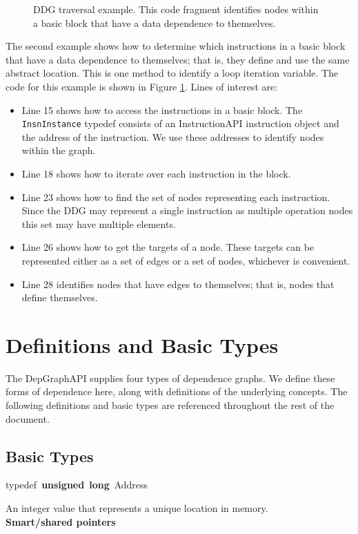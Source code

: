 \documentclass[12pt,titlepage]{article}
\begin{document}
\begin{figure}

\caption{DDG traversal example. This code fragment identifies nodes
  within a basic block that have a data dependence to themselves.}
\label{example2}
\end{figure}

The second example shows how to determine which instructions in a
basic block that have a data dependence to themselves; that is, they
define and use the same abstract location. This is one method to
identify a loop iteration variable. The code for this example is shown
in Figure \ref{example2}. Lines of interest are:
\begin{itemize}
\item Line 15 shows how to access the instructions in a basic
  block. The \texttt{InsnInstance} typedef consists of an
  InstructionAPI instruction object and the address of the
  instruction. We use these addresses to identify nodes within the
  graph.
\item Line 18 shows how to iterate over each instruction in the block.
\item Line 23 shows how to find the set of nodes representing each
  instruction. Since the DDG may represent a single instruction as
  multiple operation nodes this set may have multiple elements. 
\item Line 26 shows how to get the targets of a node. These targets
  can be represented either as a set of edges or a set of nodes,
  whichever is convenient. 
\item Line 28 identifies nodes that have edges to themselves; that is,
  nodes that define themselves. 
\end{itemize}


\section{Definitions and Basic Types}

The DepGraphAPI supplies four types of dependence graphs. We define
these forms of dependence here, along with definitions of the
underlying concepts. The following definitions and basic types are
referenced throughout the rest of the document.

\subsection{Basic Types}

{\ttfamily \raggedright \small
typedef\ \textbf{unsigned}\ \textbf{long}\ Address\\
 }
\normalfont\normalsize
\indent An integer value that represents a unique location in memory.\\[\baselineskip]
\noindent \textbf{Smart/shared pointers}
\end{document}
